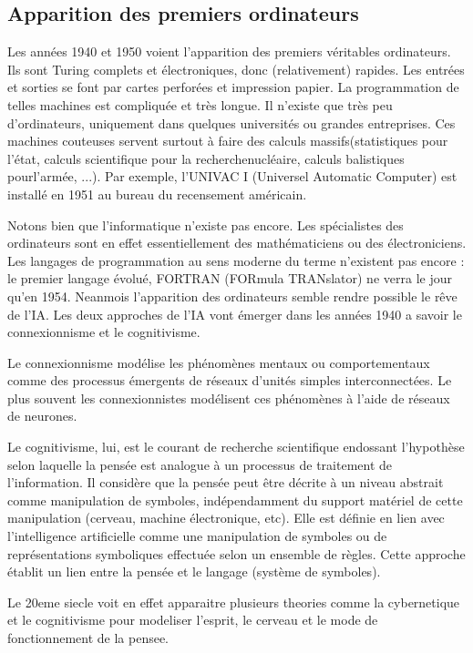  



\subsection{Apparition des premiers ordinateurs}


Les années 1940 et 1950 voient l'apparition des premiers véritables ordinateurs.
Ils sont Turing complets et électroniques, donc (relativement) rapides. Les entrées et sorties se font par cartes perforées et impression papier. La programmation de telles machines est compliquée et très longue. Il n'existe que très peu d'ordinateurs, uniquement dans quelques universités ou grandes entreprises. Ces machines couteuses servent surtout à faire des calculs massifs(statistiques pour l'état, calculs
scientifique pour la recherchenucléaire, calculs balistiques pourl'armée, ...). Par exemple, l'UNIVAC I (Universel Automatic Computer) est installé en 1951 au bureau du recensement américain.

Notons bien que l'informatique n'existe pas encore. Les spécialistes des ordinateurs sont en effet essentiellement des mathématiciens ou des électroniciens. Les langages de programmation au sens moderne du terme n'existent pas encore : le premier langage évolué, FORTRAN (FORmula TRANslator) ne verra le jour qu'en 1954. 
Neanmois l'apparition des ordinateurs semble rendre possible le rêve de l'IA. Les deux approches de l'IA vont émerger dans les années 1940 a savoir le connexionnisme et le cognitivisme.

Le connexionnisme modélise les phénomènes mentaux ou comportementaux comme des processus émergents de réseaux d'unités simples interconnectées. Le plus souvent les connexionnistes modélisent ces phénomènes à l'aide de réseaux de neurones.

Le cognitivisme, lui, est le courant de recherche scientifique endossant l'hypothèse selon laquelle la pensée est analogue à un processus de traitement de l'information. Il considère que la pensée peut être décrite à un niveau abstrait comme manipulation de symboles, indépendamment du support matériel de cette manipulation (cerveau, machine électronique, etc).
Elle est définie en lien avec l'intelligence artificielle comme une manipulation de symboles ou de représentations symboliques effectuée selon un ensemble de règles. Cette approche établit un lien entre la pensée et le langage (système de symboles).


Le 20eme siecle voit en effet apparaitre plusieurs theories comme la cybernetique et le cognitivisme pour modeliser l'esprit, le cerveau et le mode de fonctionnement de la pensee.


